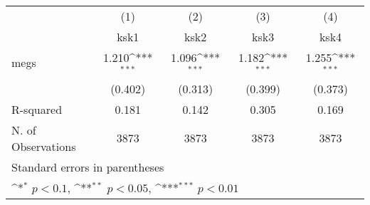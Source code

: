 {
\def\sym#1{\ifmmode^{#1}\else\(^{#1}\)\fi}
\begin{tabular}{l*{4}{c}}
\hline\hline
            &\multicolumn{1}{c}{(1)}&\multicolumn{1}{c}{(2)}&\multicolumn{1}{c}{(3)}&\multicolumn{1}{c}{(4)}\\
            &\multicolumn{1}{c}{ksk1}&\multicolumn{1}{c}{ksk2}&\multicolumn{1}{c}{ksk3}&\multicolumn{1}{c}{ksk4}\\
\hline
megs        &       1.210\sym{***}&       1.096\sym{***}&       1.182\sym{***}&       1.255\sym{***}\\
            &     (0.402)         &     (0.313)         &     (0.399)         &     (0.373)         \\
\hline
R-squared   &       0.181         &       0.142         &       0.305         &       0.169         \\
N. of Observations &        3873         &        3873         &        3873         &        3873         \\
\hline\hline
\multicolumn{5}{l}{\footnotesize Standard errors in parentheses}\\
\multicolumn{5}{l}{\footnotesize \sym{*} \(p<0.1\), \sym{**} \(p<0.05\), \sym{***} \(p<0.01\)}\\
\end{tabular}
}
